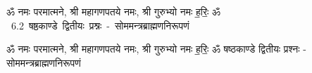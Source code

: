 \documentclass[17pt]{extarticle}
\begin{document}
\begin{titlepage}
    \begin{center}
 
\begin{sanskrit}
    { \Large
    ॐ नमः परमात्मने, श्री महागणपतये नमः, श्री गुरुभ्यो नमः
ह॒रिः॒ ॐ 
    }
    \\
    \vspace{2.5cm}
    \mbox{ \Huge
    6.2       षष्ठकाण्डे द्वितीयः प्रश्नः - सोममन्त्रब्राह्मणनिरूपणं   }
\end{sanskrit}
\end{center}

\end{titlepage}
\tableofcontents

ॐ नमः परमात्मने, श्री महागणपतये नमः, श्री गुरुभ्यो नमः
ह॒रिः॒ ॐ        षष्ठकाण्डे द्वितीयः प्रश्नः - सोममन्त्रब्राह्मणनिरूपणं \newline

\end{document}

